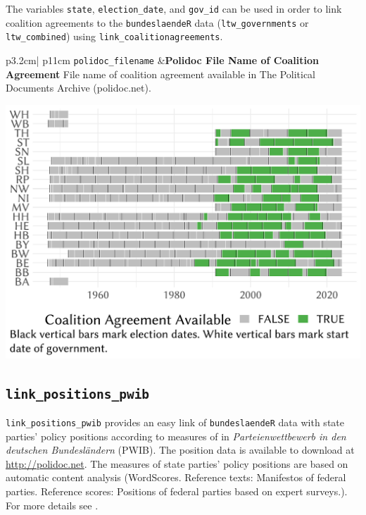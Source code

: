 \documentclass[
]{scrartcl}
\begin{document}
The variables \texttt{state}, \texttt{election\_date}, and
\texttt{gov\_id} can be used in order to link coalition agreements to
the \texttt{bundeslaendeR} data (\texttt{ltw\_governments} or
\texttt{ltw\_combined}) using \texttt{link\_coalitionagreements}.

\begin{longtable}{p{3.2cm}| p{11cm}}
\texttt{polidoc\_filename} &\textbf{Polidoc File Name of Coalition Agreement}\newline 
File name of coalition agreement available in The Political Documents Archive (polidoc.net).


\hspace*{.25cm}
\begin{minipage}[t]{\linewidth }
\vspace{0pt}
\includegraphics[width = \linewidth]{cbfiles/pltpolidocgov.pdf}
\end{minipage}





\end{longtable}

\newpage

\hypertarget{link_positions_pwib}{%
\subsection{\texorpdfstring{\texttt{link\_positions\_pwib}}{link\_positions\_pwib}}\label{link_positions_pwib}}

\texttt{link\_positions\_pwib} provides an easy link of
\texttt{bundeslaendeR} data with state parties' policy positions
according to measures of
\textcite{braeuningerParteienwettbewerbDeutschenBundeslaendern2020} in
\emph{Parteienwettbewerb in den deutschen Bundesländern} (PWIB). The
position data is available to download at \url{http://polidoc.net}. The
measures of state parties' policy positions are based on automatic
content analysis (WordScores. Reference texts: Manifestos of federal
parties. Reference scores: Positions of federal parties based on expert
surveys.). For more details see
\textcite[pp. 59ff.]{braeuningerParteienwettbewerbDeutschenBundeslaendern2020}.
\end{document}

